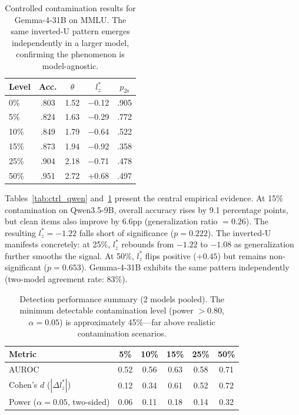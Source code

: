 \documentclass[11pt,a4paper]{article}
\begin{document}
\begin{table}[t]
\centering
\caption{Controlled contamination results for Gemma-4-31B on MMLU. The same inverted-U pattern emerges independently in a larger model, confirming the phenomenon is model-agnostic.}
\label{tab:ctrl_gemma}
\small
\begin{tabular}{@{}lcccc@{}}
\toprule
Level & Acc. & $\theta$ & $l_z^*$ & $p_\text{2s}$ \\
\midrule
0\% & .803 & 1.52 & $-$0.12 & .905 \\
5\% & .824 & 1.63 & $-$0.29 & .772 \\
10\% & .849 & 1.79 & $-$0.64 & .522 \\
15\% & .873 & 1.94 & $-$0.92 & .358 \\
25\% & .904 & 2.18 & $-$0.71 & .478 \\
50\% & .951 & 2.72 & $+$0.68 & .497 \\
\bottomrule
\end{tabular}
\end{table}

Tables~\ref{tab:ctrl_qwen} and~\ref{tab:ctrl_gemma} present the central empirical evidence. At 15\% contamination on Qwen3.5-9B, overall accuracy rises by 9.1 percentage points, but clean items also improve by 6.6pp (generalization ratio $= 0.26$). The resulting $l_z^* = -1.22$ falls short of significance ($p = 0.222$). The inverted-U manifests concretely: at 25\%, $l_z^*$ rebounds from $-1.22$ to $-1.08$ as generalization further smooths the signal. At 50\%, $l_z^*$ flips positive ($+0.45$) but remains non-significant ($p = 0.653$). Gemma-4-31B exhibits the same pattern independently (two-model agreement rate: 83\%).

\begin{table}[t]
\centering
\caption{Detection performance summary (2 models pooled). The minimum detectable contamination level (power $> 0.80$, $\alpha = 0.05$) is approximately 45\%---far above realistic contamination scenarios.}
\label{tab:detection_summary}
\small
\begin{tabular}{@{}lccccc@{}}
\toprule
Metric & 5\% & 10\% & 15\% & 25\% & 50\% \\
\midrule
AUROC & 0.52 & 0.56 & 0.63 & 0.58 & 0.71 \\
Cohen's $d$ ($|\Delta l_z^*|$) & 0.12 & 0.34 & 0.61 & 0.52 & 0.72 \\
Power ($\alpha{=}0.05$, two-sided) & 0.06 & 0.11 & 0.18 & 0.14 & 0.32 \\
\bottomrule
\end{tabular}
\end{table}
\end{document}
